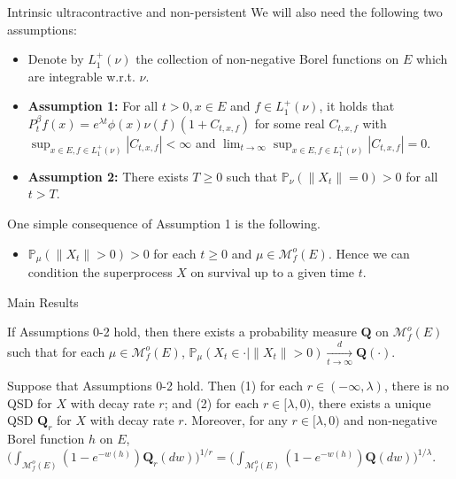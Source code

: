 \documentclass[xcolor=dvipsnames]{beamer}
\begin{document}
\begin{frame}{Intrinsic ultracontractive and non-persistent}
	We will also need the following two assumptions:
\begin{itemize}
\item
	Denote by $L_1^+(\nu)$ the collection of non-negative Borel functions on $E$ which are integrable w.r.t. $\nu$.
\item 
	{\bf Assumption 1:} For all $t>0, x\in E$ and $f\in L_1^+(\nu)$, it holds that $P_t^\beta f(x) = e^{\lambda t} \phi(x) \nu(f) (1+ C_{t,x,f})$ for some real $C_{t,x,f}$ with
	$\sup_{x\in E, f\in L_1^+(\nu)}|C_{t,x,f}|< \infty$ and
	$\lim_{t\to \infty}\sup_{x\in E, f\in L_1^+(\nu)}|C_{t,x,f}| =0$.
\item
	{\bf Assumption 2:} There exists $T\geq 0$ such that $\mathbb P_\nu(\|X_t\|=0)>0$ for all $t>T$. 
\end{itemize}
	One simple consequence of Assumption 1 is the following.
\begin{itemize}
	\item $\mathbb P_\mu(\|X_t\|>0)>0$ for each $t\geq 0$ and $\mu \in \mathcal M_f^o(E)$. 
	Hence we can condition the superprocess $X$ on survival up to a given time $t$.
\end{itemize}
\end{frame}

\begin{frame}{Main Results}
\begin{theorem}
	If Assumptions 0-2 hold, then there exists a probability measure $\mathbf Q$ on $\mathcal M_f^o(E)$ such that for each $\mu \in \mathcal M_f^o(E)$,
	$\mathbb P_\mu (X_t \in \cdot | \|X_t\| > 0) \xrightarrow[t\to \infty]{d} \mathbf Q(\cdot)$. 
\end{theorem}
\begin{theorem}
	Suppose that Assumptions 0-2 hold. Then (1) for each $r \in (-\infty, \lambda)$, there is no QSD for $X$ with decay rate $r$; and (2) for each $r\in [\lambda,0)$, there exists a unique QSD $\mathbf Q_r$ for $X$ with decay rate $r$.
	Moreover, for any $r \in [\lambda, 0)$ and non-negative Borel function $h$ on $E$,
$
	\Big(\int_{\mathcal M_f^o(E)} (1-e^{- w(h)}) \mathbf Q_r(dw)\Big)^{1/r}
	= \Big(\int_{\mathcal M_f^o(E)} (1-e^{- w(h)}) \mathbf Q (dw) \Big)^{1/\lambda}.
$
\end{theorem}
\end{frame}
\end{document}
